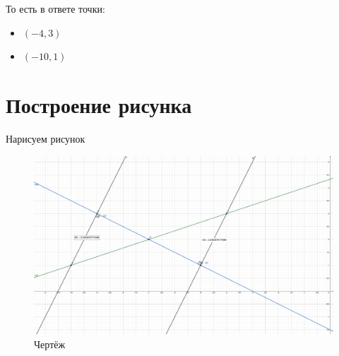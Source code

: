 \documentclass[12pt, a4paper]{article}
\begin{document}
    То есть в ответе точки:
    \begin{itemize}
        \item $(-4, 3)$
        \item $(-10, 1)$
    \end{itemize}


    \section{Построение рисунка}

    Нарисуем рисунок


    \begin{figure}
        \centering
        \includegraphics[width=\paperwidth]{resources/1.4_figure.pdf}
        \caption{Чертёж}
        \label{fig:main_figure}
    \end{figure}
    \FloatBarrier
\end{document}
